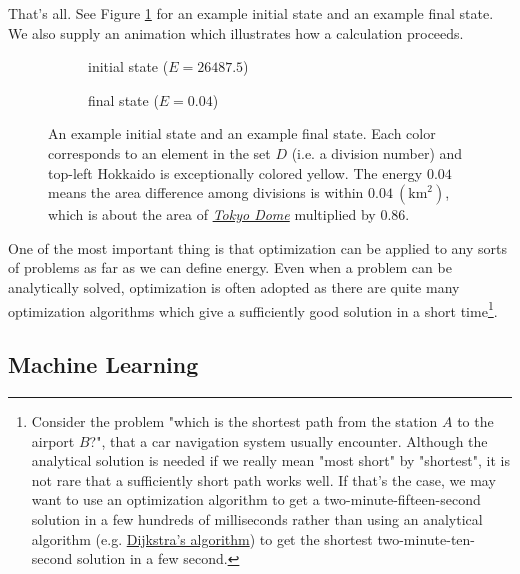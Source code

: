 \documentclass{article}
\theoremstyle{definition}
\newcommand{\fig}[1]{Figure \ref{fig:#1}}
\begin{document}
\enter\indent
That's all. See \fig{1.1} for an example initial state and an example final state. We also supply an animation \href{fig/fig\_1\_1.gif}{} which illustrates how a calculation proceeds.

\begin{figure}
    \centering
    \begin{subfigure}[b]{0.49\textwidth}
        \caption{initial state ($E = 26487.5$)}
	\end{subfigure}
    \begin{subfigure}[b]{0.49\textwidth}
        \caption{final state ($E = 0.04$)}
	\end{subfigure}
    \caption{An example initial state and an example final state. Each color corresponds to an element in the set $D$ (i.e. a division number) and top-left Hokkaido is exceptionally colored yellow. The energy $0.04$ means the area difference among divisions is within $0.04\ (\text{km}^2)$, which is about the area of \href{https://en.wikipedia.org/wiki/Tokyo_Dome}{\it Tokyo Dome} multiplied by $0.86$.}
    \label{fig:1.1}
\end{figure}

\enter\indent
One of the most important thing is that optimization can be applied to any sorts of problems as far as we can define energy. Even when a problem can be analytically solved, optimization is often adopted as there are quite many optimization algorithms which give a sufficiently good solution in a short time\footnote{Consider the problem "which is the shortest path from the station $A$ to the airport $B$?", that a car navigation system usually encounter. Although the analytical solution is needed if we really mean "most short" by "shortest", it is not rare that a sufficiently short path works well. If that's the case, we may want to use an optimization algorithm to get a two-minute-fifteen-second solution in a few hundreds of milliseconds rather than using an analytical algorithm (e.g. \href{https://en.wikipedia.org/wiki/Dijkstra\%27s\_algorithm}{Dijkstra's algorithm}) to get the shortest two-minute-ten-second solution in a few second.}.

\newpage


\subsection{Machine Learning} \label{section:1.2}
\end{document}
